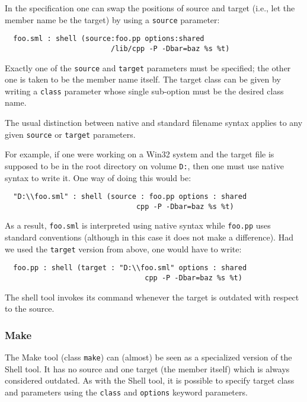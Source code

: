 \documentclass[titlepage,letterpaper]{article}
\begin{document}
In the specification one can swap the positions of source and target
(i.e., let the member name be the target) by using a {\tt source}
parameter:

\begin{verbatim}
  foo.sml : shell (source:foo.pp options:shared
                         /lib/cpp -P -Dbar=baz %s %t)
\end{verbatim}

Exactly one of the {\tt source} and {\tt target} parameters must be
specified; the other one is taken to be the member name itself.  The
target class can be given by writing a {\tt class} parameter whose
single sub-option must be the desired class name.

The usual distinction between native and standard filename syntax
applies to any given {\tt source} or {\tt target} parameters.

For example, if one were working on a Win32 system and the target file
is supposed to be in the root directory on volume {\tt D:},
then one must use native syntax to write it.  One way of doing this
would be:

\begin{verbatim}
  "D:\\foo.sml" : shell (source : foo.pp options : shared
                               cpp -P -Dbar=baz %s %t)
\end{verbatim}

\noindent As a result, {\tt foo.sml} is interpreted using native
syntax while {\tt foo.pp} uses standard conventions (although in this
case it does not make a difference).  Had we used the {\tt target}
version from above, one would have to write:

\begin{verbatim}
  foo.pp : shell (target : "D:\\foo.sml" options : shared
                                 cpp -P -Dbar=baz %s %t)
\end{verbatim}

The shell tool invokes its command whenever the target is outdated
with respect to the source.

\subsubsection*{Make}

The Make tool (class {\tt make}) can (almost) be seen as a specialized
version of the Shell tool.  It has no source and one target (the
member itself) which is always considered outdated.  As with the Shell
tool, it is possible to specify target class and parameters using the
{\tt class} and {\tt options} keyword parameters.
\end{document}
